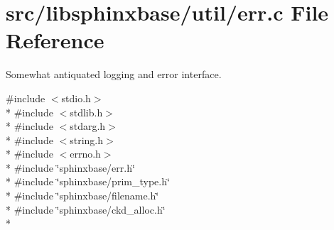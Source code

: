 \section{src/libsphinxbase/util/err.c File Reference}
\label{err_8c}


Somewhat antiquated logging and error interface.  


{\ttfamily \#include $<$stdio.\-h$>$}\\*
{\ttfamily \#include $<$stdlib.\-h$>$}\\*
{\ttfamily \#include $<$stdarg.\-h$>$}\\*
{\ttfamily \#include $<$string.\-h$>$}\\*
{\ttfamily \#include $<$errno.\-h$>$}\\*
{\ttfamily \#include \char`\"{}sphinxbase/err.\-h\char`\"{}}\\*
{\ttfamily \#include \char`\"{}sphinxbase/prim\-\_\-type.\-h\char`\"{}}\\*
{\ttfamily \#include \char`\"{}sphinxbase/filename.\-h\char`\"{}}\\*
{\ttfamily \#include \char`\"{}sphinxbase/ckd\-\_\-alloc.\-h\char`\"{}}\\*

